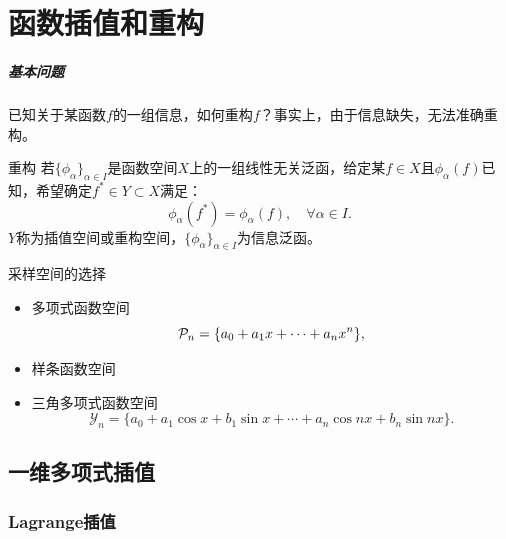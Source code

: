 \chapter{函数插值和重构}
\label{chap:interpolation}

\paragraph{基本问题}
已知关于某函数$f$的一组信息，如何重构$f$？事实上，由于信息缺失，无法准确重构。

\begin{definition}
    {重构}{}
    若$\{\phi_\alpha\}_{\alpha\in I}$是函数空间$X$上的一组线性无关泛函，给定某$f\in X$且$\phi_\alpha(f)$已知，希望确定$f^*\in Y\subset X$满足：
    \begin{equation}
        \phi_\alpha(f^*)=\phi_\alpha(f),\quad\forall\alpha\in I.
    \end{equation}
    $Y$称为插值空间或重构空间，$\{\phi_\alpha\}_{\alpha\in I}$为信息泛函。
\end{definition}


\begin{example}
    {采样空间的选择}{}
    \begin{itemize}
        \item 多项式函数空间
        \[
            \mathcal P_n=\{a_0+a_1x+\cdots+a_nx^n\},
        \]
        \item 样条函数空间
        \item 三角多项式函数空间
        \[
            \mathcal Y_n=\{a_0+a_1\cos x+b_1\sin x+\cdots+a_n\cos nx+b_n\sin nx\}.
        \]
    \end{itemize}
\end{example}

\section{一维多项式插值}
\label{sec:1-D polynomial interpolation}

\subsection{Lagrange插值}


